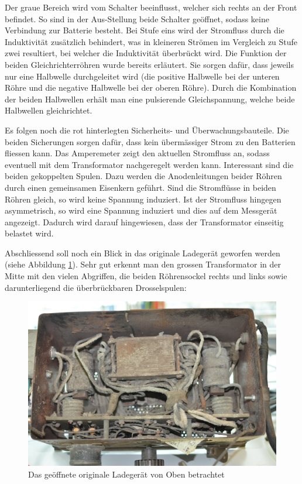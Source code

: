 Der graue Bereich wird vom Schalter beeinflusst, welcher sich rechts an der Front befindet. So sind in der Aus-Stellung beide Schalter geöffnet, sodass keine Verbindung zur Batterie besteht. Bei Stufe eins wird der Stromfluss durch die Induktivität zusätzlich behindert, was in kleineren Strömen im Vergleich zu Stufe zwei resultiert, bei welcher die Induktivität überbrückt wird. Die Funktion der beiden Gleichrichterröhren wurde bereits erläutert. Sie sorgen dafür, dass jeweils nur eine Halbwelle durchgeleitet wird (die positive Halbwelle bei der unteren Röhre und die negative Halbwelle bei der oberen Röhre). Durch die Kombination der beiden Halbwellen erhält man eine pulsierende Gleichspannung, welche beide Halbwellen gleichrichtet.

Es folgen noch die rot hinterlegten Sicherheits- und Überwachungsbauteile. Die beiden Sicherungen sorgen dafür, dass kein übermässiger Strom zu den Batterien fliessen kann. Das Amperemeter zeigt den aktuellen Stromfluss an, sodass eventuell mit dem Transformator nachgeregelt werden kann. Interessant sind die beiden gekoppelten Spulen. Dazu werden die Anodenleitungen beider Röhren durch einen gemeinsamen Eisenkern geführt. Sind die Stromflüsse in beiden Röhren gleich, so wird keine Spannung induziert. Ist der Stromfluss hingegen asymmetrisch, so wird eine Spannung induziert und dies auf dem Messgerät angezeigt. Dadurch wird darauf hingewiesen, dass der Transformator einseitig belastet wird.

Abschliessend soll noch ein Blick in das originale Ladegerät geworfen werden (siehe Abbildung \ref{fig:Ladegeraet_Original}). Sehr gut erkennt man den grossen Transformator in der Mitte mit den vielen Abgriffen, die beiden Röhrensockel rechts und links sowie darunterliegend die überbrückbaren Drosselspulen:

\begin{figure}[h]
	\centering
		\includegraphics[width=1.0\textwidth]{images/Ladegeraet_Original.JPG}
	\caption{Das geöffnete originale Ladegerät von Oben betrachtet}
	\label{fig:Ladegeraet_Original}
\end{figure}

\newpage